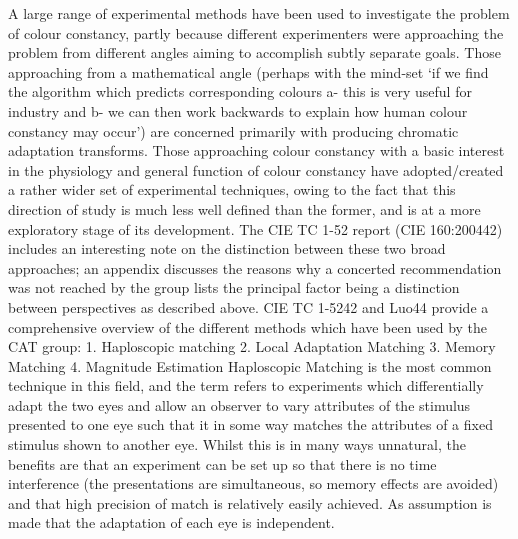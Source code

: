 A large range of experimental methods have been used to investigate the problem of colour constancy, partly because different experimenters were approaching the problem from different angles aiming to accomplish subtly separate goals.
Those approaching from a mathematical angle (perhaps with the mind-set `if we find the algorithm which predicts corresponding colours a- this is very useful for industry and b- we can then work backwards to explain how human colour constancy may occur') are concerned primarily with producing chromatic adaptation transforms.
Those approaching colour constancy with a basic interest in the physiology and general function of colour constancy have adopted/created a rather wider set of experimental techniques, owing to the fact that this direction of study is much less well defined than the former, and is at a more exploratory stage of its development.
The CIE TC 1-52 report (CIE 160:200442) includes an interesting note on the distinction between these two broad approaches; an appendix discusses the reasons why a concerted recommendation was not reached by the group lists the principal factor being a distinction between perspectives as described above. 
CIE TC 1-5242 and Luo44 provide a comprehensive overview of the different methods which have been used by the CAT group:
1.	Haploscopic matching
2.	Local Adaptation Matching
3.	Memory Matching
4.	Magnitude Estimation
Haploscopic Matching is the most common technique in this field, and the term refers to experiments which differentially adapt the two eyes and allow an observer to vary attributes of the stimulus presented to one eye such that it in some way matches the attributes of a fixed stimulus shown to another eye. Whilst this is in many ways unnatural, the benefits are that an experiment can be set up so that there is no time interference (the presentations are simultaneous, so memory effects are avoided) and that high precision of match is relatively easily achieved. As assumption is made that the adaptation of each eye is independent.
 
